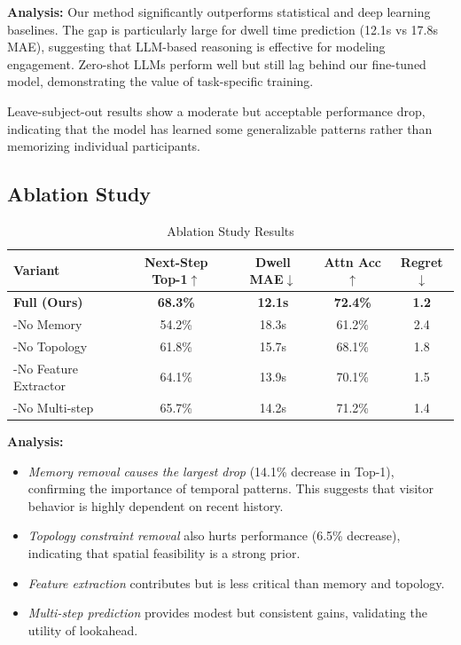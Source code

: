 \documentclass[letterpaper]{article}
\begin{document}
\textbf{Analysis:} Our method significantly outperforms statistical and deep learning baselines. The gap is particularly large for dwell time prediction (12.1s vs 17.8s MAE), suggesting that LLM-based reasoning is effective for modeling engagement. Zero-shot LLMs perform well but still lag behind our fine-tuned model, demonstrating the value of task-specific training.

Leave-subject-out results show a moderate but acceptable performance drop, indicating that the model has learned some generalizable patterns rather than memorizing individual participants.

\subsection{Ablation Study}

\begin{table}[h]
\centering
\caption{Ablation Study Results}
\begin{tabular}{lcccc}
\toprule
Variant & Next-Step Top-1$\uparrow$ & Dwell MAE$\downarrow$ & Attn Acc$\uparrow$ & Regret$\downarrow$ \\
\midrule
\textbf{Full (Ours)} & \textbf{68.3\%} & \textbf{12.1s} & \textbf{72.4\%} & \textbf{1.2} \\
-No Memory & 54.2\% & 18.3s & 61.2\% & 2.4 \\
-No Topology & 61.8\% & 15.7s & 68.1\% & 1.8 \\
-No Feature Extractor & 64.1\% & 13.9s & 70.1\% & 1.5 \\
-No Multi-step & 65.7\% & 14.2s & 71.2\% & 1.4 \\
\bottomrule
\end{tabular}
\label{tab:ablation}
\end{table}

\textbf{Analysis:}
\begin{itemize}
    \item \textit{Memory removal causes the largest drop} (14.1\% decrease in Top-1), confirming the importance of temporal patterns. This suggests that visitor behavior is highly dependent on recent history.
    \item \textit{Topology constraint removal} also hurts performance (6.5\% decrease), indicating that spatial feasibility is a strong prior.
    \item \textit{Feature extraction} contributes but is less critical than memory and topology.
    \item \textit{Multi-step prediction} provides modest but consistent gains, validating the utility of lookahead.
\end{itemize}
\end{document}
